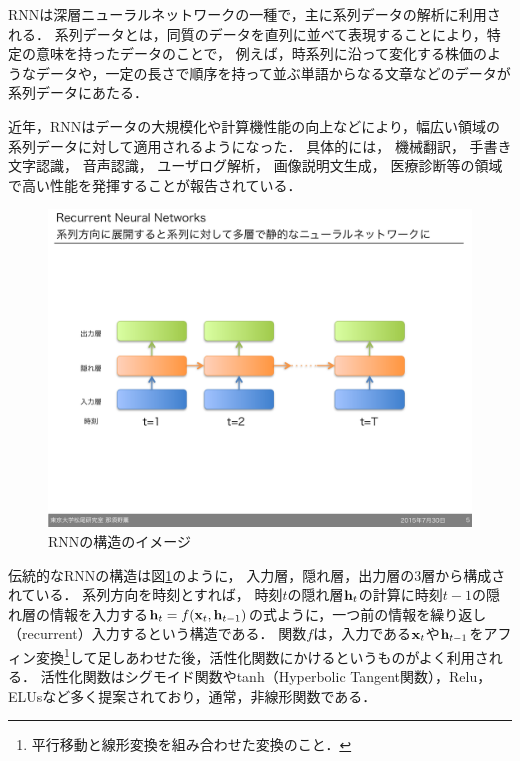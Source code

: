 RNNは深層ニューラルネットワークの一種で，主に系列データの解析に利用される．
系列データとは，同質のデータを直列に並べて表現することにより，特定の意味を持ったデータのことで，
例えば，時系列に沿って変化する株価のようなデータや，一定の長さで順序を持って並ぶ単語からなる文章などのデータが系列データにあたる．

近年，RNNはデータの大規模化や計算機性能の向上などにより，幅広い領域の系列データに対して適用されるようになった．
具体的には，
機械翻訳\cite{sutskever2014sequence, dong2015multi}，
手書き文字認識\cite{graves2009offline,louradour2014curriculum}，
音声認識\cite{hinton2012deep,bahdanau2015end}，
ユーザログ解析\cite{hidasi2015session}，
画像説明文生成\cite{xu2015show,vinyals2014show}，
医療診断\cite{choi2015doctor,lipton2015learning}等の領域で高い性能を発揮することが報告されている．

\begin{figure}[htb]
\begin{center}
\includegraphics[width=350pt]{./img/RNN.pdf}
\end{center}
\caption{RNNの構造のイメージ}
\label{fig:RNN}
\end{figure}
伝統的なRNNの構造は図\ref{fig:RNN}のように，
入力層，隠れ層，出力層の3層から構成されている．
系列方向を時刻とすれば，
時刻$t$の隠れ層${\bf h}_t$の計算に時刻$t-1$の隠れ層の情報を入力する${\bf h}_t = f({\bf x}_t, {\bf h}_{t-1})$の式ように，一つ前の情報を繰り返し（recurrent）入力するという構造である．
関数$f$は，入力である${\bf x}_t$や${\bf h}_{t-1}$をアフィン変換\footnote{平行移動と線形変換を組み合わせた変換のこと．}して足しあわせた後，活性化関数にかけるというものがよく利用される．
活性化関数はシグモイド関数やtanh（Hyperbolic Tangent関数），Relu\cite{nair2010rectified}，ELUs\cite{clevert2015fast}など多く提案されており，通常，非線形関数である．



